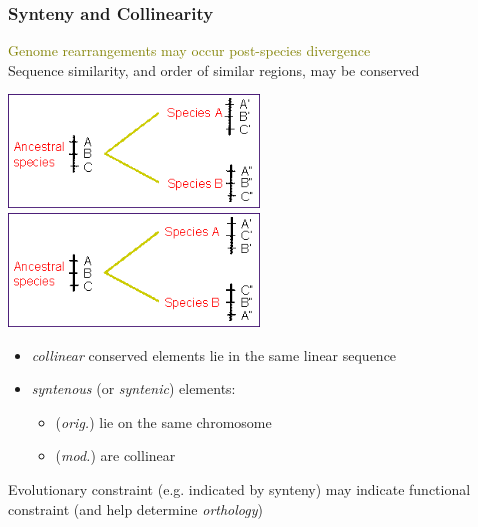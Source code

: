 \begin{frame}
  \frametitle{Synteny and Collinearity}
  \textcolor{olive}{Genome rearrangements may occur post-species divergence} \\
  Sequence similarity, and order of similar regions, may be conserved
  \begin{center}
    \includegraphics[width=0.5\textwidth]{images/collinear}    
    \includegraphics[width=0.5\textwidth]{images/synteny}
  \end{center}    
  \begin{itemize}
    \item \textcolor{hutton_blue}{\textit{collinear}} conserved elements lie in the same linear sequence
    \item \textcolor{hutton_purple}{\textit{syntenous} (or \textit{syntenic})} elements:
    \begin{itemize}
      \item (\textit{orig.}) lie on the same chromosome
      \item (\textit{mod.}) are collinear
    \end{itemize}
  \end{itemize}
  \textcolor{hutton_green}{Evolutionary constraint} (e.g. indicated by synteny) may indicate \textcolor{hutton_green}{functional constraint} (and help determine \textit{orthology})
\end{frame}

